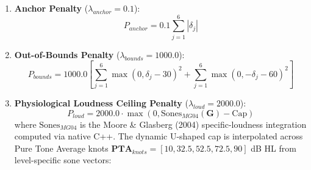 \documentclass[
]{article}
\begin{document}
\begin{enumerate}
\def\labelenumi{\arabic{enumi}.}
\item
  \textbf{Anchor Penalty} (\(\lambda_{anchor} = 0.1\)): \begin{equation}
  P_{anchor} = 0.1 \sum_{j=1}^6 |\delta_j|
  \end{equation}
\item
  \textbf{Out-of-Bounds Penalty} (\(\lambda_{bounds} = 1000.0\)):
  \begin{equation}
  P_{bounds} = 1000.0 \left[\sum_{j=1}^6 \max(0, \delta_j - 30)^2 + \sum_{j=1}^6 \max(0, -\delta_j - 60)^2\right]
  \end{equation}
\item
  \textbf{Physiological Loudness Ceiling Penalty}
  (\(\lambda_{loud} = 2000.0\)): \begin{equation}
  P_{loud} = 2000.0 \cdot \max(0, \text{Sones}_{MG04}(\mathbf{G}) - \text{Cap})
  \end{equation} where \(\text{Sones}_{MG04}\) is the Moore \& Glasberg
  (2004) specific-loudness integration computed via native C++. The
  dynamic U-shaped cap is interpolated across Pure Tone Average knots
  \(\mathbf{PTA}_{knots} = [10, 32.5, 52.5, 72.5, 90]\) dB HL from
  level-specific sone vectors:


\end{enumerate}
\end{document}
